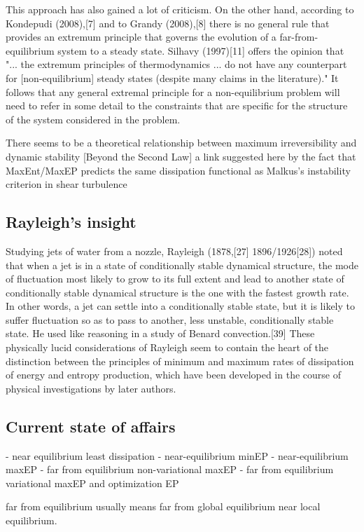 \documentclass[a4paper,12pt,nofootinbib]{article}
\begin{document}
This approach has also gained a lot of criticism.
On the other hand, according to Kondepudi (2008),[7] and to Grandy (2008),[8] there is no general rule that provides an extremum principle that governs the evolution of a far-from-equilibrium system to a steady state. 
Silhavy (1997)[11] offers the opinion that "... the extremum principles of thermodynamics ... do not have any counterpart for [non-equilibrium] steady states (despite many claims in the literature)." It follows that any general extremal principle for a non-equilibrium problem will need to refer in some detail to the constraints that are specific for the structure of the system considered in the problem.

There seems to be a theoretical relationship between maximum irreversibility and dynamic stability [Beyond the Second Law] a link suggested here by the fact that MaxEnt/MaxEP predicts the same dissipation functional as Malkus's instability criterion in shear turbulence

\subsection{Rayleigh's insight}
Studying jets of water from a nozzle, Rayleigh (1878,[27] 1896/1926[28]) noted that when a jet is in a state of conditionally stable dynamical structure, the mode of fluctuation most likely to grow to its full extent and lead to another state of conditionally stable dynamical structure is the one with the fastest growth rate. In other words, a jet can settle into a conditionally stable state, but it is likely to suffer fluctuation so as to pass to another, less unstable, conditionally stable state. He used like reasoning in a study of Benard convection.[39] These physically lucid considerations of Rayleigh seem to contain the heart of the distinction between the principles of minimum and maximum rates of dissipation of energy and entropy production, which have been developed in the course of physical investigations by later authors.

\subsection{Current state of affairs}

- near equilibrium least dissipation
- near-equilibrium minEP
- near-equilibrium maxEP
- far from equilibrium non-variational maxEP
- far from equilibrium variational maxEP and optimization EP

far from equilibrium usually means far from global equilibrium near local equilibrium.
\end{document}
